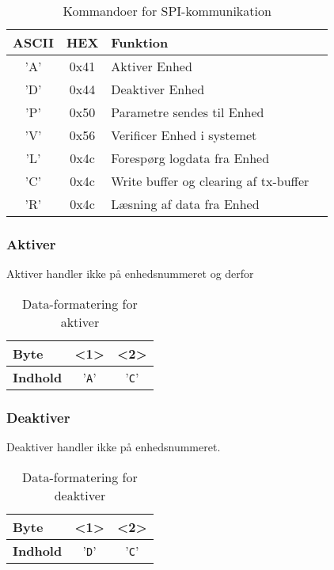 \begin{table}[H]
\caption{Kommandoer for SPI-kommunikation}
\centering
\begin{tabular}{|c|c|l|c|}
\hline 
\textbf{ASCII} & \textbf{HEX} & \textbf{Funktion} \\ 
\hline 
'A' & 0x41 & Aktiver Enhed \\ 
\hline 
'D' & 0x44 & Deaktiver Enhed \\ 
\hline 
'P' & 0x50 & Parametre sendes til Enhed \\
\hline 
'V' & 0x56 & Verificer Enhed i systemet \\ 
\hline
'L' & 0x4c & Forespørg logdata fra Enhed \\ 
\hline
'C' & 0x4c & Write buffer og clearing af tx-buffer  \\
\hline
'R' & 0x4c & Læsning af data fra Enhed \\
\hline
\end{tabular}
\label{tabel:SWProtokol-kommandoer}
\end{table} 


\subsubsection{Aktiver}

Aktiver handler ikke på enhedsnummeret og derfor 

\begin{table}[h]
	\caption{Data-formatering for aktiver}
	\centering
	\begin{tabular}{|l|c|c|}
		\hline 
		\textbf{Byte} & \textbf{<1>} & \textbf{<2>} \\ 
		\hline 
		\textbf{Indhold} & '\verb+A+' & '\verb+C+'\\ 
		\hline 
	\end{tabular} 
	\label{table:SWProtokol-aktiver}
\end{table}

\subsubsection{Deaktiver}

Deaktiver handler ikke på enhedsnummeret.

\begin{table}[h]
	\caption{Data-formatering for deaktiver}
	\centering
	\begin{tabular}{|l|c|c|}
		\hline 
		\textbf{Byte} & \textbf{<1>} & \textbf{<2>} \\ 
		\hline 
		\textbf{Indhold} & '\verb+D+' & '\verb+C+'\\ 
		\hline 
	\end{tabular} 
	\label{table:SWProtokol-deaktiver}
\end{table}

